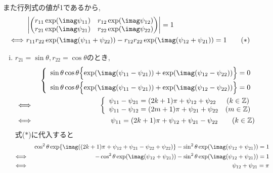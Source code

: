 \documentclass[dvipdfmx,titlepage, 11pt, a4paper]{jsarticle}%
\begin{document}
\begin{enumerate}[(1)]
    また行列式の値が1であるから,
    \begin{align*}
      &\left|\begin{pmatrix}r_{11}\exp(\imag \psi_{11})&r_{12}\exp(\imag \psi_{12})\\r_{21}\exp(\imag \psi_{21})&r_{22}\exp(\imag \psi_{22})\end{pmatrix}\right| = 1 \\
      \Longleftrightarrow\ & r_{11}r_{22}\exp(\imag (\psi_{11}+\psi_{22}))-r_{12}r_{22}\exp(\imag (\psi_{12}+\psi_{21}))=1 \tag{$\ast$}
    \end{align*}
    \begin{enumerate}[(i)]
    \item $r_{21}=\sin \theta,r_{22}=\cos\theta$のとき,
      \begin{eqnarray*}
        &&\left\{
        \begin{array}{l}
          \sin\theta\cos\theta\Bigl\{\exp(\imag(\psi_{11}-\psi_{21}))+\exp(\imag(\psi_{12}-\psi_{22}))\Bigr\}=0\\[0.2cm]
          \sin\theta\cos\theta\Bigl\{\exp(\imag(\psi_{11}-\psi_{21}))+\exp(\imag(\psi_{12}-\psi_{22}))\Bigr\}=0
        \end{array}
        \right.\\
        \Longleftrightarrow\ &&\left\{
                                \begin{array}{lc}
                                  \psi_{11}-\psi_{21}=(2k+1)\pi +\psi_{12}+\psi_{22}&(k\in\mathbb{Z})\\
                                  \psi_{11}-\psi_{12}=(2m+1)\pi+\psi_{21}+\psi_{22}&(m\in\mathbb{Z})\\
                                \end{array}
        \right.\\
        \Longleftrightarrow\ && \psi_{11}=(2k+1)\pi+\psi_{12}+\psi_{21}-\psi_{22}\hspace{20pt} (k\in\mathbb{Z})
      \end{eqnarray*}
      式($\ast$)に代入すると
      \begin{eqnarray*}
        &&\cos^{2}\theta\exp\{\imag((2k+1)\pi+\psi_{12}+\psi_{21}-\psi_{22}+\psi_{22})\}-\sin^{2}\theta\exp(\imag(\psi_{12}+\psi_{21}))=1\\
        \Longleftrightarrow\ &&-\cos^{2}\theta\exp(\imag(\psi_{12}+\psi_{21}))-\sin^{2}\theta\exp(\imag(\psi_{12}+\psi_{21}))=1\\
        \Longleftrightarrow\ && \psi_{12}+\psi_{21} = \pi
      \end{eqnarray*}

\end{enumerate}
\end{enumerate}
\end{document}
